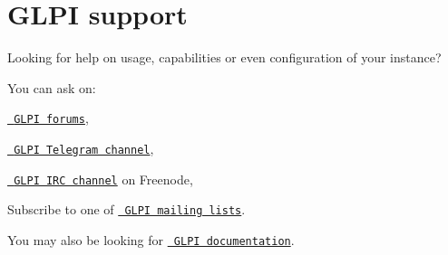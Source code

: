 \chapter{GLPI support}
\hypertarget{md_public_2glpi_2_s_u_p_p_o_r_t}{}\label{md_public_2glpi_2_s_u_p_p_o_r_t}
\label{md_public_2glpi_2_s_u_p_p_o_r_t_autotoc_md5645}%
%
 Looking for help on usage, capabilities or even configuration of your  instance?

You can ask on\+:
\begin{DoxyItemize}
\item \href{https://forum.glpi-project.org}{\texttt{ GLPI forums}},
\item \href{https://t.me/glpien}{\texttt{ GLPI Telegram channel}},
\item \href{http://webchat.freenode.net/?channels=glpi}{\texttt{ GLPI IRC channel}}  on Freenode,
\item Subscribe to one of \href{https://glpi-project.org/community}{\texttt{ GLPI mailing lists}}.
\end{DoxyItemize}

You may also be looking for \href{https://glpi-project.org/resources/\#documentation}{\texttt{ GLPI documentation}}. 